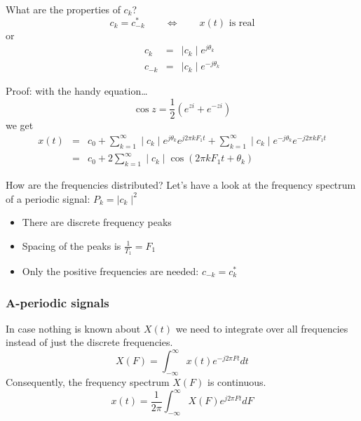 \documentclass[12pt,a4paper]{article}
\begin{document}
What are the properties of $c_{k}$?
\begin{equation}
c_{k} = c_{- k}^{*} \qquad \Leftrightarrow \qquad x(t)\mbox{ is real}
\end{equation}
or
\begin{eqnarray}
c_{k} &=& \mid c_k \mid e^{j \theta_k} \\
c_{-k} &=& \mid c_k \mid e^{-j \theta_k}
\end{eqnarray}

Proof: with the handy equation\ldots
\begin{equation}
\cos z = \frac{1}{2} \left(e^{zi} + e^{-zi}\right)
\end{equation}
we get
\begin{eqnarray} 
x(t) & = & c_0 + \sum_{k = 1}^{\infty} \mid c_k \mid e^{j \theta_k} e^{j 2\pi k F_1 t}
               + \sum_{k = 1}^{\infty} \mid c_{k}\mid e^{-j \theta_k} e^{-j 2\pi k F_1 t} \\
     & = & c_0 + 2 \sum_{k = 1}^{\infty} \mid c_k \mid \cos(2 \pi k F_1 t + \theta_{k})
\end{eqnarray}



How are the frequencies distributed? Let's have a look at the
frequency spectrum of a periodic signal: $P_{k} = \mid c_{k} \mid^{2}$

\begin{itemize}
\item There are discrete frequency peaks
\item Spacing of the peaks is $\frac{1}{T_1} = F_1$
\item Only the positive frequencies are needed: $c_{-k} = c_{k}^{*}$
\end{itemize}



\subsubsection{A-periodic signals}
In case nothing is known about $X(t)$ we need to integrate
over all frequencies instead of just the discrete frequencies.
\begin{equation} 
X(F) = \int_{-\infty}^{\infty} x(t) e^{-j 2 \pi F t} dt
\end{equation}
Consequently, the frequency spectrum $X(F)$ is continuous.
\begin{equation} 
x(t) = \frac{1}{2\pi} \int_{-\infty}^{\infty} X(F) e^{j 2 \pi F t} dF
\end{equation}
\end{document}
